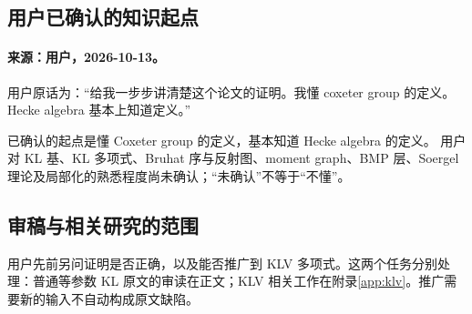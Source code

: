 \subsection{用户已确认的知识起点}\label{sec:reader-background}
\paragraph{来源：用户，2026-10-13。}
用户原话为：“给我一步步讲清楚这个论文的证明。我懂 coxeter group 的定义。Hecke algebra 基本上知道定义。”

已确认的起点是懂 Coxeter group 的定义，基本知道 Hecke algebra 的定义。
用户对 KL 基、KL 多项式、Bruhat 序与反射图、moment graph、BMP 层、Soergel 理论及局部化的熟悉程度尚未确认；“未确认”不等于“不懂”。

\subsection{审稿与相关研究的范围}
用户先前另问证明是否正确，以及能否推广到 KLV 多项式。这两个任务分别处理：普通等参数 KL 原文的审读在正文；KLV 相关工作在附录\ref{app:klv}。推广需要新的输入不自动构成原文缺陷。
